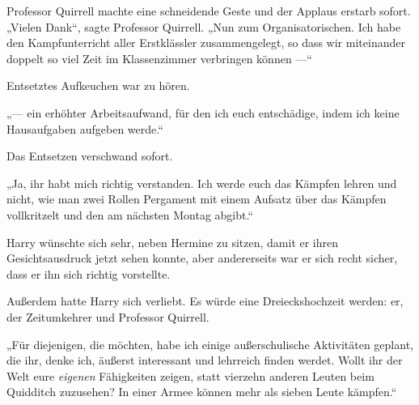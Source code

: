 Professor Quirrell machte eine schneidende Geste und der Applaus erstarb sofort.
„Vielen Dank“, sagte Professor Quirrell.
„Nun zum Organisatorischen. Ich habe den Kampfunterricht aller Erstklässler zusammengelegt, so dass wir miteinander doppelt so viel Zeit im Klassenzimmer verbringen können —“

Entsetztes Aufkeuchen war zu hören.

„— ein erhöhter Arbeitsaufwand, für den ich euch entschädige, indem ich keine Hausaufgaben aufgeben werde.“

Das Entsetzen verschwand sofort.

„Ja, ihr habt mich richtig verstanden. Ich werde euch das Kämpfen lehren und nicht, wie man zwei Rollen Pergament mit einem Aufsatz über das Kämpfen vollkritzelt und den am nächsten Montag abgibt.“

Harry wünschte sich sehr, neben Hermine zu sitzen, damit er ihren Gesichtsausdruck jetzt sehen konnte, aber andererseits war er sich recht sicher, dass er ihn sich richtig vorstellte.

Außerdem hatte Harry sich verliebt. Es würde eine Dreieckshochzeit werden: er, der Zeitumkehrer und Professor Quirrell.

„Für diejenigen, die möchten, habe ich einige außerschulische Aktivitäten geplant, die ihr, denke ich, äußerst interessant und lehrreich finden werdet. Wollt ihr der Welt eure \emph{eigenen} Fähigkeiten zeigen, statt vierzehn anderen Leuten beim Quidditch zuzusehen? In einer Armee können mehr als sieben Leute kämpfen.“

